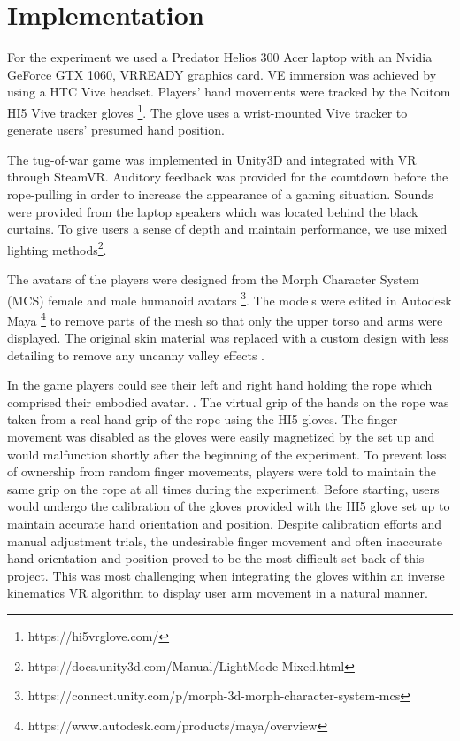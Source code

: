 
\section{Implementation}

For the experiment we used a Predator Helios 300 Acer laptop with an Nvidia GeForce GTX 1060, VRREADY graphics card. VE immersion was achieved by using a HTC Vive headset. 
Players' hand movements were tracked by the Noitom HI5 Vive tracker gloves \footnote{https://hi5vrglove.com/}. The glove uses a wrist-mounted Vive tracker to generate users' presumed hand position. 

The tug-of-war game was implemented in Unity3D and integrated with VR through SteamVR. Auditory feedback was provided for the countdown before the rope-pulling in order to increase the appearance of a gaming situation. Sounds were provided from the laptop speakers which was located behind the black curtains. 
To give users a sense of depth and maintain performance, we use mixed lighting methods\footnote{https://docs.unity3d.com/Manual/LightMode-Mixed.html}.

The avatars of the players were designed from the Morph Character System (MCS) female and male humanoid avatars  \footnote{https://connect.unity.com/p/morph-3d-morph-character-system-mcs}. The models were edited in Autodesk Maya \footnote{https://www.autodesk.com/products/maya/overview} to remove parts of the mesh so that only the upper torso and arms were displayed. The original skin material was replaced with a custom design with less detailing to remove any uncanny valley effects \cite{geller2008overcoming}. 

In the game players could see their left and right hand holding the rope which comprised their embodied avatar. . The virtual grip of the hands on the rope was taken from a real hand grip of the rope using the HI5 gloves. The finger movement was disabled as the gloves were easily magnetized by the set up and would malfunction shortly after the beginning of the experiment. To prevent loss of ownership from random finger movements, players were told to maintain the same grip on the rope at all times during the experiment. Before starting, users would undergo the calibration of the gloves provided with the HI5 glove set up to maintain accurate hand orientation and position. Despite calibration efforts and manual adjustment trials, the  undesirable finger movement and often inaccurate hand orientation and position proved to be the most difficult set back of this project. This was most challenging when integrating the gloves within an inverse kinematics VR algorithm to display user arm movement in a natural manner.

